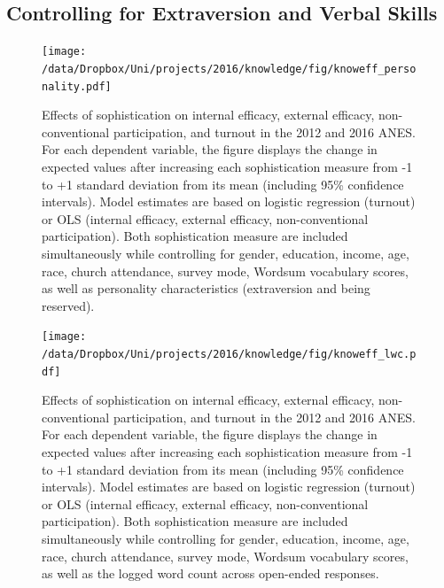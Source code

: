 \subsection{Controlling for Extraversion and Verbal Skills}\label{app:personality}
\begin{figure}[h]\centering
\texttt{[image: /data/Dropbox/Uni/projects/2016/knowledge/fig/knoweff\_personality.pdf]}
\caption[Effects of sophistication on political engagement controlling for personality characteristics in the 2012 and 2016 ANES]{Effects of sophistication on internal efficacy, external efficacy, non-conventional participation, and turnout in the 2012 and 2016 ANES. For each dependent variable, the figure displays the change in expected values after increasing each sophistication measure from -1 to +1 standard deviation from its mean (including 95\% confidence intervals). Model estimates are based on logistic regression (turnout) or OLS (internal efficacy, external efficacy, non-conventional participation). Both sophistication measure are included simultaneously while controlling for gender, education, income, age, race, church attendance, survey mode, Wordsum vocabulary scores, as well as personality characteristics (extraversion and being reserved).%
}\label{fig:knoweff_personality}
\end{figure}

\begin{figure}[h]\centering
\texttt{[image: /data/Dropbox/Uni/projects/2016/knowledge/fig/knoweff\_lwc.pdf]}
\caption[Effects of sophistication on political engagement controlling for response length in the 2012 and 2016 ANES]{Effects of sophistication on internal efficacy, external efficacy, non-conventional participation, and turnout in the 2012 and 2016 ANES. For each dependent variable, the figure displays the change in expected values after increasing each sophistication measure from -1 to +1 standard deviation from its mean (including 95\% confidence intervals). Model estimates are based on logistic regression (turnout) or OLS (internal efficacy, external efficacy, non-conventional participation). Both sophistication measure are included simultaneously while controlling for gender, education, income, age, race, church attendance, survey mode, Wordsum vocabulary scores, as well as the logged word count across open-ended responses.%
}\label{fig:knoweff_lwc}
\end{figure}


